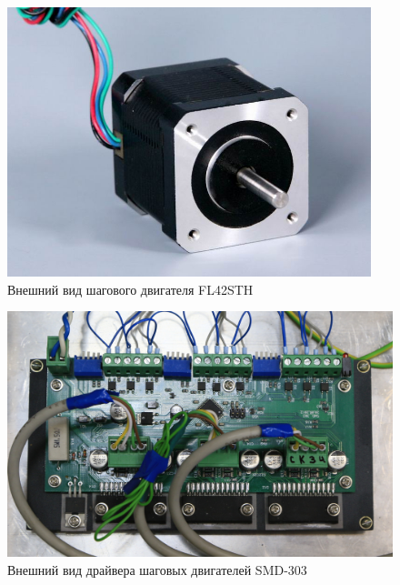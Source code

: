 \documentclass[14pt,russian,a4paper]{extarticle}
\begin{document}
\begin{figure}[h!]
    \centerline{\includegraphics[width=300pt]{media/fl42sth.jpg}}
    \caption{Внешний вид шагового двигателя FL42STH}
    \label{fig:stepper}
\end{figure}

\begin{figure}[h!]
    \centerline{\includegraphics[width=400pt]{media/smd-303.jpg}}
    \caption{Внешний вид драйвера шаговых двигателей SMD-303}
    \label{fig:stepper_driver}
\end{figure}
\end{document}
